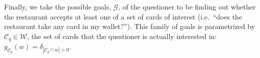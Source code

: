\documentclass[11pt, floatsintext]{apa6}
\begin{document}
Finally, we take the possible goals, $\mathcal{G}$, of the questioner to be finding out whether the restaurant accepts at least one of a set of cards of interest (i.e.~``does the restaurant take any card in my wallet?''). This family of goals is parametrized by $\mathcal{C}_q \in \mathcal{W}$, the set of cards that the questioner is actually interested in: 
$g_{\mathcal{C}_q}(w) = \delta_{|\mathcal{C}_q \cap w | > 0}$.


\end{document}
